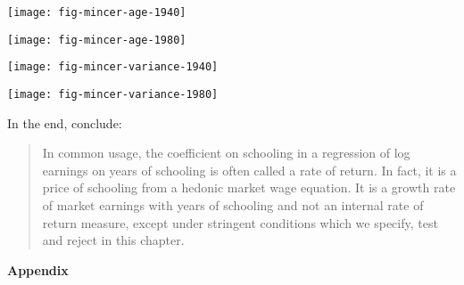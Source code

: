 \begin{frame}[plain]
\begin{center}
\texttt{[image: fig-mincer-age-1940]}
\end{center}
\end{frame}

\begin{frame}[plain]
\begin{center}
\texttt{[image: fig-mincer-age-1980]}
\end{center}
\end{frame}

\begin{frame}[plain]
\begin{center}
\texttt{[image: fig-mincer-variance-1940]}
\end{center}
\end{frame}

\begin{frame}[plain]
\begin{center}
\texttt{[image: fig-mincer-variance-1980]}
\end{center}
\end{frame}


\begin{frame}
In the end, \citet{Heckman.2006a} conclude:\vspace{0.5cm}

\begin{quote}
In common usage, the coefficient on schooling in a regression of log earnings on
years of schooling is often called a rate of return. In fact, it is a price of schooling from
a hedonic market wage equation. It is a growth rate of market earnings with years of
schooling and not an internal rate of return measure, except under stringent conditions
which we specify, test and reject in this chapter.
\end{quote}
\end{frame}


\beginbackup\appendix
\begin{frame}\begin{center}
\LARGE\textbf{Appendix}
\end{center}\end{frame}


